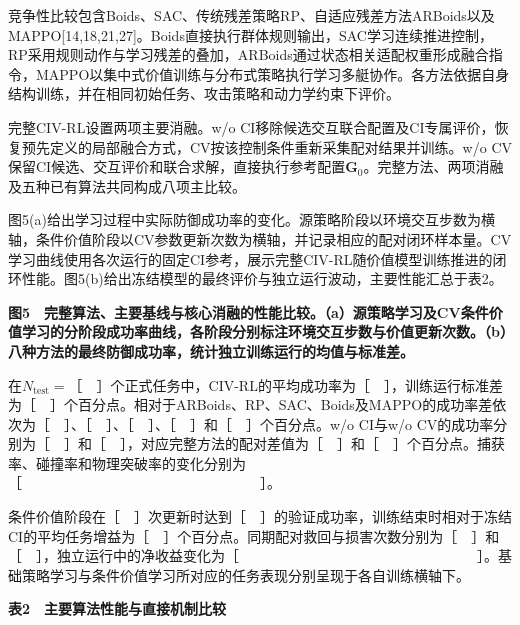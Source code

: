 \documentclass[
  11pt,
  fontset=none]{ctexart}
\newcommand{\blankresultfigure}{\par\Needspace{58mm}\begin{center}\setlength{\fboxsep}{0pt}\fbox{\rule{0pt}{32mm}\rule{.96\linewidth}{0pt}}\end{center}\par\nopagebreak[4]}
\begin{document}
竞争性比较包含Boids、SAC、传统残差策略RP、自适应残差方法ARBoids以及MAPPO{[}14,18,21,27{]}。Boids直接执行群体规则输出，SAC学习连续推进控制，RP采用规则动作与学习残差的叠加，ARBoids通过状态相关适配权重形成融合指令，MAPPO以集中式价值训练与分布式策略执行学习多艇协作。各方法依据自身结构训练，并在相同初始任务、攻击策略和动力学约束下评价。

完整CIV-RL设置两项主要消融。w/o
CI移除候选交互联合配置及CI专属评价，恢复预先定义的局部融合方式，CV按该控制条件重新采集配对结果并训练。w/o
CV保留CI候选、交互评价和联合求解，直接执行参考配置\(\boldsymbol G_0\)。完整方法、两项消融及五种已有算法共同构成八项主比较。

图5(a)给出学习过程中实际防御成功率的变化。源策略阶段以环境交互步数为横轴，条件价值阶段以CV参数更新次数为横轴，并记录相应的配对闭环样本量。CV学习曲线使用各次运行的固定CI参考，展示完整CIV-RL随价值模型训练推进的闭环性能。图5(b)给出冻结模型的最终评价与独立运行波动，主要性能汇总于表2。

\blankresultfigure

\textbf{图5　完整算法、主要基线与核心消融的性能比较。（a）源策略学习及CV条件价值学习的分阶段成功率曲线，各阶段分别标注环境交互步数与价值更新次数。（b）八种方法的最终防御成功率，统计独立训练运行的均值与标准差。}

在\(N_{\mathrm{test}}=\text{［　］}\)个正式任务中，CIV-RL的平均成功率为［　］，训练运行标准差为［　］个百分点。相对于ARBoids、RP、SAC、Boids及MAPPO的成功率差依次为［　］、［　］、［　］、［　］和［　］个百分点。w/o
CI与w/o
CV的成功率分别为［　］和［　］，对应完整方法的配对差值为［　］和［　］个百分点。捕获率、碰撞率和物理突破率的变化分别为［　　　　　　　　　　　　　　　　　］。

条件价值阶段在［　］次更新时达到［　］的验证成功率，训练结束时相对于冻结CI的平均任务增益为［　］个百分点。同期配对救回与损害次数分别为［　］和［　］，独立运行中的净收益变化为［　　　　　　　　　　　　　　　　　］。基础策略学习与条件价值学习所对应的任务表现分别呈现于各自训练横轴下。

\textbf{表2　主要算法性能与直接机制比较}
\end{document}
